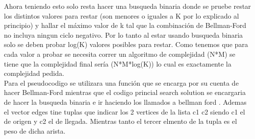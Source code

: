 Ahora teniendo esto solo resta hacer una busqueda binaria donde se pruebe restar los distintos valores para restar (son menores o iguales a K por lo explicado al principio) y hallar el máximo valor de k tal que la combinación de Bellman-Ford no incluya ningun ciclo negativo. Por lo tanto al estar usando busqueda binaria solo se deben probar log(K) valores posibles para restar. Como tenemos que para cada valor a probar se necesita correr un algoritmo de complejidad \bigo(N*M) se tiene que la complejidad final sería \bigo(N*M*log(K)) lo cual es exactamente la complejidad pedida.\\


Para el pseudocodigo se utilizara una función que se encarga por su cuenta de hacer Bellman-Ford mientras que el codigo princial search solution se encargaria de hacer la busqueda binaria e ir haciendo los llamados a bellman ford . Ademas el vector edges tine tuplas que indicar los 2 vertices de la lista c1 c2 siendo c1 el de origen y c2 el de llegada. Mientras tanto el tercer elmento de la tupla es el peso de dicha arista.





